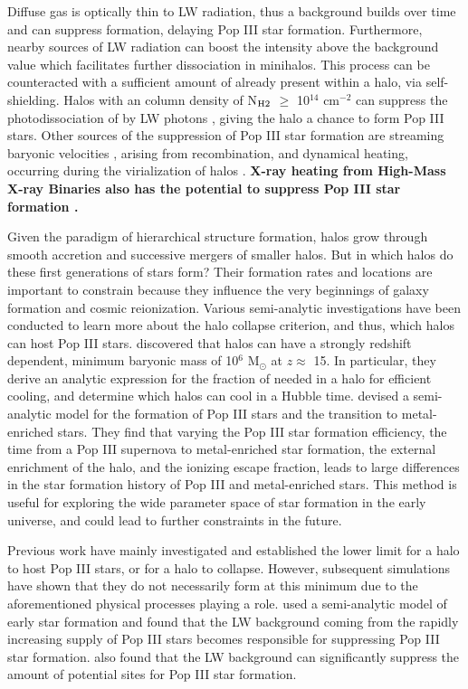 \documentclass[fleqn,usenatbib]{mnras}
\begin{document}
Diffuse gas is optically thin to LW radiation, thus a background builds over time and can suppress \hh{} formation, delaying Pop III star formation. Furthermore, nearby sources of LW radiation can boost the intensity above the background value which facilitates further \hh{} dissociation in minihalos. This process can be counteracted with a sufficient amount of \hh{} already present within a halo, via \hh{} self-shielding. Halos with an \hh{} column density of N$_{\rm H2}$ $\geq$ 10$^{14}$ cm$^{-2}$ can suppress the photodissociation of \hh{} by LW photons \citep{Draine96}, giving the halo a chance to form Pop III stars. Other sources of the suppression of Pop III star formation are streaming baryonic velocities \citep{Tselia11, Greif11_Delay, Naoz12,OLeary12}, arising from recombination, and dynamical heating, occurring during the virialization of halos \citep{Yoshida03, Fernandez14}. \textbf{X-ray heating from High-Mass X-ray Binaries also has the potential to suppress Pop III star formation \citep{Jeon14}.} 

Given the paradigm of hierarchical structure formation, halos grow through smooth accretion and successive mergers of smaller halos. But in which halos do these first generations of stars form? Their formation rates and locations are important to constrain because they influence the very beginnings of galaxy formation and cosmic reionization. Various semi-analytic investigations have been conducted to learn more about the halo collapse criterion, and thus, which halos can host Pop III stars. \citet{Tegmark97} discovered that halos can have a strongly redshift dependent, minimum baryonic mass of 10$^{6}$ M$_{\odot}$ at $z \approx$ 15. In particular, they derive an analytic expression for the fraction of \hh{} needed in a halo for efficient cooling, and determine which  halos can cool in a Hubble time. \citet{Visbal18} devised a semi-analytic model for the formation of Pop III stars and the transition to metal-enriched stars. They find that varying the Pop III star formation efficiency, the time from a Pop III supernova to metal-enriched star formation, the external enrichment of the halo, and the ionizing escape fraction, leads to large differences in the star formation history of Pop III and metal-enriched stars. This method is useful for exploring the wide parameter space of star formation in the early universe, and could lead to further constraints in the future. 

Previous work have mainly investigated and established the lower limit for a halo to host Pop III stars, or for a halo to collapse. However, subsequent simulations have shown that they do not necessarily form at this minimum due to the aforementioned physical processes playing a role. \citet{Mebane18} used a semi-analytic model of early star formation and found that the LW background coming from the rapidly increasing supply of Pop III stars becomes responsible for suppressing Pop III star formation. \citet{Griffen18} also found that the LW background can significantly suppress the amount of potential sites for Pop III star formation. 
\end{document}
